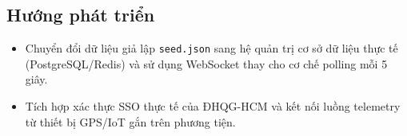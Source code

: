 \subsection{Hướng phát triển}
\begin{itemize}
    \item Chuyển đổi dữ liệu giả lập \texttt{seed.json} sang hệ quản trị cơ sở dữ liệu thực tế (PostgreSQL/Redis) và sử dụng WebSocket thay cho cơ chế polling mỗi 5 giây.
    \item Tích hợp xác thực SSO thực tế của ĐHQG-HCM và kết nối luồng telemetry từ thiết bị GPS/IoT gắn trên phương tiện.
\end{itemize}
